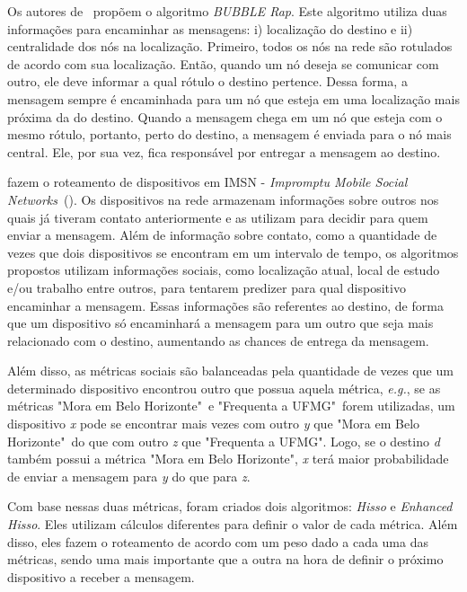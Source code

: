 \documentclass[11pt,a4paper,titlepage]{article}
\begin{document}
Os autores de~\cite{Crowcroft} propõem o algoritmo \textit{BUBBLE Rap}.
Este algoritmo utiliza duas informações para encaminhar as mensagens: i) localização do destino e ii) centralidade dos nós na localização.
Primeiro, todos os nós na rede são rotulados de acordo com sua localização.
Então, quando um nó deseja se comunicar com outro, ele deve informar a qual rótulo o destino pertence.
Dessa forma, a mensagem sempre é encaminhada para um nó que esteja em uma localização mais próxima da do destino.
Quando a mensagem chega em um nó que esteja com o mesmo rótulo, portanto, perto do destino, a mensagem é enviada para o nó mais central.
Ele, por sua vez, fica responsável por entregar a mensagem ao destino.

\cite{Xiao} fazem o roteamento de dispositivos em IMSN - \textit{Impromptu Mobile Social Networks}~(\cite{Xiao}).
Os dispositivos na rede armazenam informações sobre outros nos quais já tiveram contato anteriormente e as utilizam para decidir para quem enviar a mensagem.
Além de informação sobre contato, como a quantidade de vezes que dois dispositivos se encontram em um intervalo de tempo, os algoritmos propostos utilizam informações sociais, como localização atual, local de estudo e/ou trabalho entre outros, para tentarem predizer para qual dispositivo encaminhar a mensagem.
Essas informações são referentes ao destino, de forma que um dispositivo só encaminhará a mensagem para um outro que seja mais relacionado com o destino, aumentando as chances de entrega da mensagem.

Além disso, as métricas sociais são balanceadas pela quantidade de vezes que um determinado dispositivo encontrou outro que possua aquela métrica, \textit{e.g.}, se as métricas "Mora em Belo Horizonte"~e "Frequenta a UFMG"~forem utilizadas, um dispositivo \textit{x} pode se encontrar mais vezes com outro \textit{y} que "Mora em Belo Horizonte"~do que com outro \textit{z} que "Frequenta a UFMG".
Logo, se o destino \textit{d} também possui a métrica "Mora em Belo Horizonte", \textit{x} terá maior probabilidade de enviar a mensagem para \textit{y} do que para \textit{z}.

Com base nessas duas métricas, foram criados dois algoritmos: \textit{Hisso} e \textit{Enhanced Hisso}.
Eles utilizam cálculos diferentes para definir o valor de cada métrica.
Além disso, eles fazem o roteamento de acordo com um peso dado a cada uma das métricas, sendo uma mais importante que a outra na hora de definir o próximo dispositivo a receber a mensagem.
\end{document}
